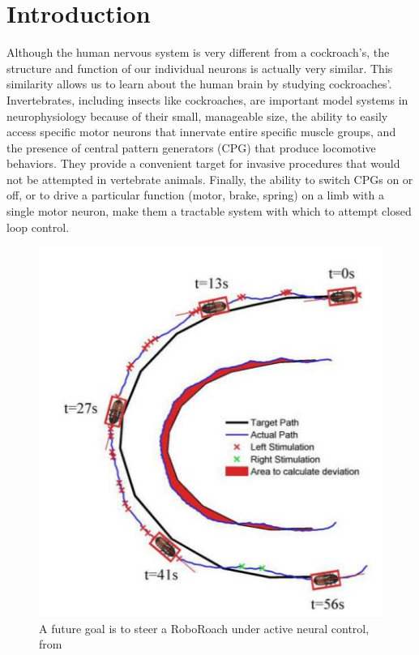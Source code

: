 \section{Introduction}
\label{sec:intro}

Although the human nervous system is very different from a cockroach’s, the structure and function of our individual neurons is actually very similar. This similarity allows us to learn about the human brain by studying cockroaches'. Invertebrates, including insects like cockroaches, are important model systems in neurophysiology because of their small, manageable size, the ability to easily access specific motor neurons that innervate entire specific muscle groups, and the presence of central pattern generators (CPG) that produce locomotive behaviors. They provide a convenient target for invasive procedures that would not be attempted in vertebrate animals. Finally, the ability to switch CPGs on or off, or to drive a particular function (motor, brake, spring) on a limb with a single motor neuron, make them a tractable system with which to attempt closed loop control. 

\begin{figure}[ht!]
\centering
\includegraphics[scale=0.5]{Figures/motivation1.JPG}
\caption{A future goal is to steer a RoboRoach under active neural control, from \citep{whitmire2013kinect}}
\label{fig:motivation1}
\end{figure}

